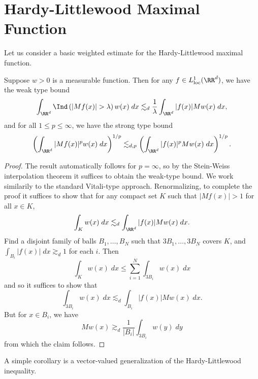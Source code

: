 \section{Hardy-Littlewood Maximal Function}

Let us consider a basic weighted estimate for the Hardy-Littlewood maximal function.

\begin{theorem}
  Suppose $w > 0$ is a measurable function. Then for any $f \in L^1_{\text{loc}}(\RR^d)$, we have the weak type bound
  \[ \int_{\RR^d} \Ind \left( |Mf(x)| > \lambda \right) w(x)\; dx \lesssim_d \frac{1}{\lambda} \int_{\RR^d} |f(x)| Mw(x)\; dx, \]
  and for all $1 \leq p \leq \infty$, we have the strong type bound
  \[ \left( \int_{\RR^d} |Mf(x)|^p w(x)\; dx \right)^{1/p} \lesssim_{d,p} \left( \int_{\RR^d} |f(x)|^p Mw(x)\; dx \right)^{1/p}. \]
\end{theorem}
\begin{proof}
  The result automatically follows for $p = \infty$, so by the Stein-Weiss interpolation theorem it suffices to obtain the weak-type bound. We work similarily to the standard Vitali-type approach. Renormalizing, to complete the proof it suffices to show that for any compact set $K$ such that $|Mf(x)| > 1$ for all $x \in K$,
  \[ \int_K w(x)\; dx \lesssim_d \int_{\RR^d} |f(x)| Mw(x)\; dx. \]
  Find a disjoint family of balls $B_1,\dots,B_N$ such that $3B_1,\dots,3B_N$ covers $K$, and $\int_{B_i} |f(x)|\; dx \gtrsim_d 1$ for each $i$. Then
  \[ \int_K w(x)\; dx \leq \sum_{i = 1}^N \int_{3B_i} w(x)\; dx \]
  and so it suffices to show that
  \[ \int_{3B_i} w(x)\; dx \lesssim_d \int_{B_i} |f(x)| Mw(x)\; dx. \]
  But for $x \in B_i$, we have
  \[ Mw(x) \gtrsim_d \frac{1}{|B_i|} \int_{3B_i} w(y)\; dy \]
  from which the claim follows.
\end{proof}

A simple corollary is a vector-valued generalization of the Hardy-Littlewood inequality.

